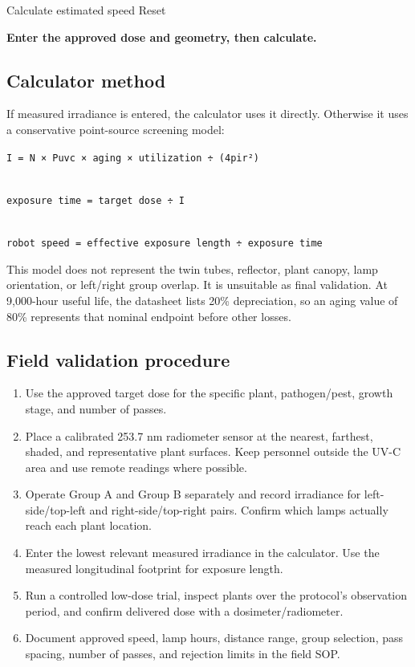 \documentclass[
  10pt,
  letterpaper,
  openany]{report}
\providecommand{\tightlist}{%
  \setlength{\itemsep}{0pt}\setlength{\parskip}{0pt}}
\begin{document}
Calculate estimated speed Reset

\protect{}\label{uvcResult}
\textbf{Enter the approved dose and geometry, then calculate.}

\subsection{Calculator method}\label{calculator-method}

If measured irradiance is entered, the calculator uses it directly.
Otherwise it uses a conservative point-source screening model:

\texttt{I\ =\ N\ ×\ Puvc\ ×\ aging\ ×\ utilization\ ÷\ (4pir²)}\strut \\
\texttt{exposure\ time\ =\ target\ dose\ ÷\ I}\strut \\
\texttt{robot\ speed\ =\ effective\ exposure\ length\ ÷\ exposure\ time}

This model does not represent the twin tubes, reflector, plant canopy,
lamp orientation, or left/right group overlap. It is unsuitable as final
validation. At 9,000-hour useful life, the datasheet lists 20\%
depreciation, so an aging value of 80\% represents that nominal endpoint
before other losses.

\subsection{Field validation
procedure}\label{field-validation-procedure}

\begin{enumerate}
\tightlist
\item
  Use the approved target dose for the specific plant, pathogen/pest,
  growth stage, and number of passes.
\item
  Place a calibrated 253.7 nm radiometer sensor at the nearest,
  farthest, shaded, and representative plant surfaces. Keep personnel
  outside the UV-C area and use remote readings where possible.
\item
  Operate Group A and Group B separately and record irradiance for
  left-side/top-left and right-side/top-right pairs. Confirm which lamps
  actually reach each plant location.
\item
  Enter the lowest relevant measured irradiance in the calculator. Use
  the measured longitudinal footprint for exposure length.
\item
  Run a controlled low-dose trial, inspect plants over the protocol's
  observation period, and confirm delivered dose with a
  dosimeter/radiometer.
\item
  Document approved speed, lamp hours, distance range, group selection,
  pass spacing, number of passes, and rejection limits in the field SOP.
\end{enumerate}
\end{document}
